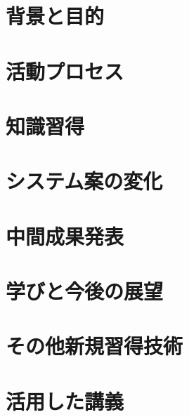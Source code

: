\documentclass[openany,11pt,papersize]{jsbook}
\begin{document}
%
\maketitle

\frontmatter



\tableofcontents%


\mainmatter%

\chapter{背景と目的}



\chapter{活動プロセス}



\chapter{知識習得}



\chapter{システム案の変化}



\chapter{中間成果発表}



\chapter{学びと今後の展望}



\begin{appendix}

\chapter{その他新規習得技術}


\chapter{活用した講義}


\end{appendix}
\end{document}
